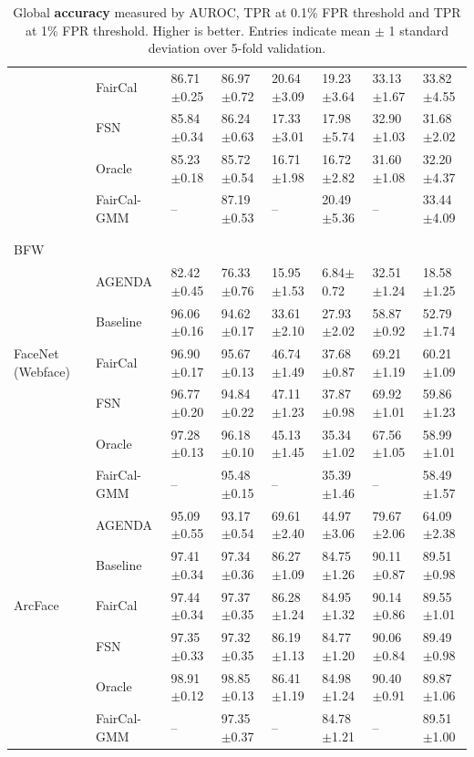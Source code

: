 \begin{table}
\begin{tabular}{l l ll ll ll}
& FairCal     &  86.71$\pm$0.25 &  86.97$\pm$0.72 &   20.64$\pm$3.09 &  19.23$\pm$3.64 &  33.13$\pm$1.67 &  33.82$\pm$4.55 \\
& FSN         &  85.84$\pm$0.34 &  86.24$\pm$0.63 &   17.33$\pm$3.01 &  17.98$\pm$5.74 &  32.90$\pm$1.03 &  31.68$\pm$2.02 \\
& Oracle      &  85.23$\pm$0.18 &  85.72$\pm$0.54 &   16.71$\pm$1.98 &  16.72$\pm$2.82 &  31.60$\pm$1.08 &  32.20$\pm$4.37 \\
& FairCal-GMM &           -- &  87.19$\pm$0.53 &            -- &  20.49$\pm$5.36 &           -- &  33.44$\pm$4.09 \\
\\\midrule\\
BFW \\
\midrule
\multirow{5}{5em}{FaceNet (Webface)} 
& AGENDA      &  82.42$\pm$0.45 &  76.33$\pm$0.76 &   15.95$\pm$1.53 &   6.84$\pm$0.72 &  32.51$\pm$1.24 &  18.58$\pm$1.25 \\
& Baseline    &  96.06$\pm$0.16 &  94.62$\pm$0.17 &   33.61$\pm$2.10 &  27.93$\pm$2.02 &  58.87$\pm$0.92 &  52.79$\pm$1.74 \\
& FairCal     &  96.90$\pm$0.17 &  95.67$\pm$0.13 &   46.74$\pm$1.49 &  37.68$\pm$0.87 &  69.21$\pm$1.19 &  60.21$\pm$1.09 \\
& FSN         &  96.77$\pm$0.20 &  94.84$\pm$0.22 &   47.11$\pm$1.23 &  37.87$\pm$0.98 &  69.92$\pm$1.01 &  59.86$\pm$1.23 \\
& Oracle      &  97.28$\pm$0.13 &  96.18$\pm$0.10 &   45.13$\pm$1.45 &  35.34$\pm$1.02 &  67.56$\pm$1.05 &  58.99$\pm$1.01 \\
& FairCal-GMM &           -- &  95.48$\pm$0.15 &            -- &  35.39$\pm$1.46 &           -- &  58.49$\pm$1.57 \\
\hline
\multirow{5}{5em}{ArcFace} 
& AGENDA      &  95.09$\pm$0.55 &  93.17$\pm$0.54 &   69.61$\pm$2.40 &  44.97$\pm$3.06 &  79.67$\pm$2.06 &  64.09$\pm$2.38 \\
& Baseline    &  97.41$\pm$0.34 &  97.34$\pm$0.36 &   86.27$\pm$1.09 &  84.75$\pm$1.26 &  90.11$\pm$0.87 &  89.51$\pm$0.98 \\
& FairCal     &  97.44$\pm$0.34 &  97.37$\pm$0.35 &   86.28$\pm$1.24 &  84.95$\pm$1.32 &  90.14$\pm$0.86 &  89.55$\pm$1.01 \\
& FSN         &  97.35$\pm$0.33 &  97.32$\pm$0.35 &   86.19$\pm$1.13 &  84.77$\pm$1.20 &  90.06$\pm$0.84 &  89.49$\pm$0.98 \\
& Oracle      &  98.91$\pm$0.12 &  98.85$\pm$0.13 &   86.41$\pm$1.19 &  84.98$\pm$1.24 &  90.40$\pm$0.91 &  89.87$\pm$1.06 \\
& FairCal-GMM &           -- &  97.35$\pm$0.37 &            -- &  84.78$\pm$1.21 &           -- &  89.51$\pm$1.00 \\
\bottomrule
\end{tabular}
\caption{Global \textcolor{Emerald}{\textbf{accuracy}} measured by AUROC, TPR at 0.1\% FPR threshold and TPR at 1\% FPR threshold. Higher is better. Entries indicate mean $\pm$ 1 standard deviation over 5-fold validation.}
\label{tab:AccAp}
\end{table}

